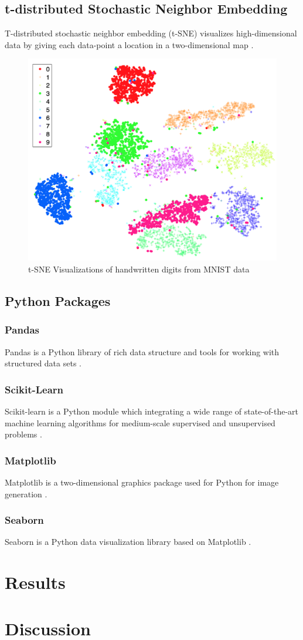 \documentclass[a4paper]{article}
\begin{document}
        \subsection[t-SNE]{t-distributed Stochastic Neighbor Embedding}
            T-distributed stochastic neighbor embedding (t-SNE) visualizes high-dimensional data by giving each data-point a location in a two-dimensional map \cite{tsne1}.

            \begin{figure}[p]
                \centering
                \includegraphics[width=0.5 \linewidth]{figures/tsne.png}
                \caption{t-SNE Visualizations of handwritten digits from MNIST data \protect \cite{tsne1}}
                \label{fig:tsne}
            \end{figure}

        \subsection{Python Packages}
            \subsubsection{Pandas}
                Pandas is a Python library of rich data structure and tools for working with structured data sets \cite{pandas1}.

            \subsubsection{Scikit-Learn}
                Scikit-learn is a Python module which integrating a wide range of state-of-the-art machine learning algorithms for medium-scale supervised and unsupervised problems \cite{sklearn1}.

            \subsubsection{Matplotlib}
                Matplotlib is a two-dimensional graphics package used for Python for image generation \cite{matplotlib1}.

            \subsubsection{Seaborn}
                Seaborn is a Python data visualization library based on Matplotlib \cite{seaborn1}.

    \section{Results}

    \section{Discussion}

    
    
\end{document}
